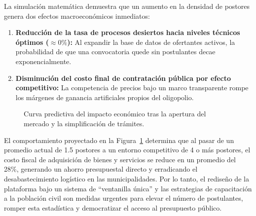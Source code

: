 \documentclass[12pt,a4paper]{article}
\begin{document}
La simulación matemática demuestra que un aumento en la densidad de postores genera dos efectos macroeconómicos inmediatos:
\begin{enumerate}
    \item \textbf{Reducción de la tasa de procesos desiertos hacia niveles técnicos óptimos ($\approx 0\%$):} Al expandir la base de datos de ofertantes activos, la probabilidad de que una convocatoria quede sin postulantes decae exponencialmente.
    \item \textbf{Disminución del costo final de contratación pública por efecto competitivo:} La competencia de precios bajo un marco transparente rompe los márgenes de ganancia artificiales propios del oligopolio.
\end{enumerate}

\begin{figure}[htbp]
\centering
{}
\caption{Curva predictiva del impacto económico tras la apertura del mercado y la simplificación de trámites.}
\label{fig:curva_economica}
\end{figure}

El comportamiento proyectado en la Figura~\ref{fig:curva_economica} determina que al pasar de un promedio actual de 1.5 postores a un entorno competitivo de 4 o más postores, el costo fiscal de adquisición de bienes y servicios se reduce en un promedio del 28\%, generando un ahorro presupuestal directo y erradicando el desabastecimiento logístico en las municipalidades. Por lo tanto, el rediseño de la plataforma bajo un sistema de ``ventanilla única'' y las estrategias de capacitación a la población civil son medidas urgentes para elevar el número de postulantes, romper esta estadística y democratizar el acceso al presupuesto público.
\end{document}
